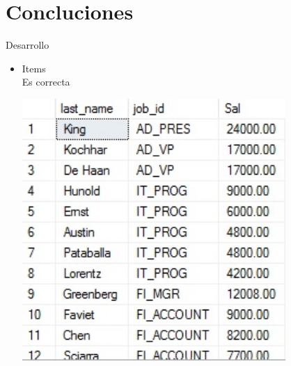 \section{Concluciones} 
Desarrollo

\begin{itemize}
	\item Items
	\\Es correcta
	\begin{center}
	\includegraphics[width=10cm]{./Imagenes/actividad0101} 
	\end{center}



\end{itemize} 